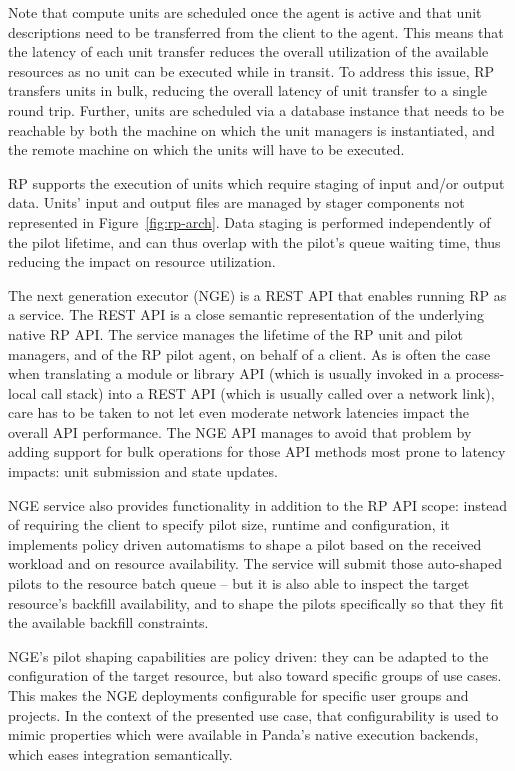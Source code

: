 \documentclass{webofc}
\begin{document}
Note that compute units are scheduled once the agent is active and that unit
descriptions need to be transferred from the client to the agent. This means
that the latency of each unit transfer reduces the overall utilization of the
available resources as no unit can be executed while in transit. To address
this issue, RP transfers units in bulk, reducing the overall latency of unit
transfer to a single round trip. Further, units are scheduled via a database
instance that needs to be reachable by both the machine on which the unit
managers is instantiated, and the remote machine on which the units will have
to be executed.
	
RP supports the execution of units which require staging of input and/or
output data. Units’ input and output files are managed by stager components
not represented in Figure~\ref{fig:rp-arch}. Data staging is performed
independently of the pilot lifetime, and can thus overlap with the pilot's
queue waiting time, thus reducing the impact on resource utilization.
	
The next generation executor (NGE) is a REST API that enables running RP as a
service. The REST API is a close semantic representation of the underlying
native RP API.  The service manages the lifetime of the RP unit and pilot
managers, and of the RP pilot agent, on behalf of a client. As is often the
case when translating a module or library API (which is usually invoked in a
process-local call stack) into a REST API (which is usually called over a
network link), care has to be taken to not let even moderate network
latencies impact the overall API performance.  The NGE API manages to avoid
that problem by adding support for bulk operations for those API methods most
prone to latency impacts: unit submission and state updates.
	
NGE service also provides functionality in addition to the RP API scope:
instead of requiring the client to specify pilot size, runtime and
configuration, it implements policy driven automatisms to shape a pilot based
on the received workload and on resource availability.  The service will
submit those auto-shaped pilots to the resource batch queue -- but it is also
able to inspect the target resource's backfill availability, and to shape the
pilots specifically so that they fit the available backfill constraints.
	
NGE's pilot shaping capabilities are policy driven: they can be adapted to
the configuration of the target resource, but also toward specific groups of
use cases. This makes the NGE deployments configurable for specific user
groups and projects.  In the context of the presented use case, that
configurability is used to mimic properties which were available in Panda's
native execution backends, which eases integration semantically.
\end{document}
